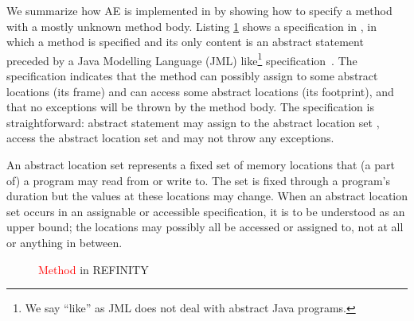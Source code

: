 We summarize how AE is implemented in \Refinity{} by showing how to specify a method  with a mostly unknown method body.
Listing \ref{lst:ExtractVariable-refinity-method} shows a specification in \Refinity{}, in which a method  is specified and its only content is an abstract statement  preceded by a Java Modelling Language (JML) like\footnote{We say ``like'' as JML does not deal with abstract Java programs.} specification~\cite{HuismanAhrendtBruns2014_1000041881}.
%
The specification indicates that the method can possibly assign to some abstract locations (its frame) and can access some abstract locations (its footprint), and that no exceptions will be thrown by the method body.
The specification is straightforward: abstract statement  may assign to the abstract location set , access the abstract location set  and may not throw any exceptions.

An abstract location set represents a fixed set of memory locations that (a part of) a program may read from or write to.
The set is fixed through a program's duration but the values at these locations may change.
When an abstract location set occurs in an assignable or accessible specification, it is to be understood as an upper bound;
the locations may possibly all be accessed or assigned to, not at all or anything in between.

\begin{figure}[tbp]
  \centering
  \captionsetup{type=lstlisting}
  \begin{sublstlisting}{.65\linewidth}
  
  \end{sublstlisting}
  \caption{\textcolor{red}{Method} in REFINITY}
  \label{lst:ExtractVariable-refinity-method}
\end{figure}

